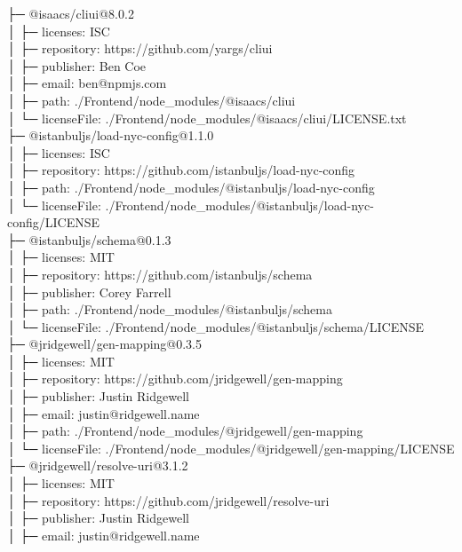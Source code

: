 \documentclass[
    paper=a4,
    twoside=false,
    parskip=half,
    listof=entryprefix,
    listof=totoc,
    index=totoc,
    bibliography=totoc,
    headsepline,
]{scrbook}
\begin{document}
    ├─ @isaacs/cliui@8.0.2\\
    │  ├─ licenses: ISC\\
    │  ├─ repository: https://github.com/yargs/cliui\\
    │  ├─ publisher: Ben Coe\\
    │  ├─ email: ben@npmjs.com\\
    │  ├─ path: ./Frontend/node\_modules/@isaacs/cliui\\
    │  └─ licenseFile: ./Frontend/node\_modules/@isaacs/cliui/LICENSE.txt\\
    ├─ @istanbuljs/load-nyc-config@1.1.0\\
    │  ├─ licenses: ISC\\
    │  ├─ repository: https://github.com/istanbuljs/load-nyc-config\\
    │  ├─ path: ./Frontend/node\_modules/@istanbuljs/load-nyc-config\\
    │  └─ licenseFile: ./Frontend/node\_modules/@istanbuljs/load-nyc-config/LICENSE\\
    ├─ @istanbuljs/schema@0.1.3\\
    │  ├─ licenses: MIT\\
    │  ├─ repository: https://github.com/istanbuljs/schema\\
    │  ├─ publisher: Corey Farrell\\
    │  ├─ path: ./Frontend/node\_modules/@istanbuljs/schema\\
    │  └─ licenseFile: ./Frontend/node\_modules/@istanbuljs/schema/LICENSE\\
    ├─ @jridgewell/gen-mapping@0.3.5\\
    │  ├─ licenses: MIT\\
    │  ├─ repository: https://github.com/jridgewell/gen-mapping\\
    │  ├─ publisher: Justin Ridgewell\\
    │  ├─ email: justin@ridgewell.name\\
    │  ├─ path: ./Frontend/node\_modules/@jridgewell/gen-mapping\\
    │  └─ licenseFile: ./Frontend/node\_modules/@jridgewell/gen-mapping/LICENSE\\
    ├─ @jridgewell/resolve-uri@3.1.2\\
    │  ├─ licenses: MIT\\
    │  ├─ repository: https://github.com/jridgewell/resolve-uri\\
    │  ├─ publisher: Justin Ridgewell\\
    │  ├─ email: justin@ridgewell.name\\
\end{document}
